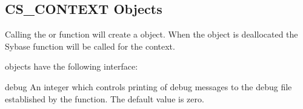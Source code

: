 \subsection{CS_CONTEXT Objects}

Calling the  or 
function will create a  object.  When the
 object is deallocated the Sybase
 function will be called for the context.

 objects have the following interface:

\begin{memberdesc}[CS_CONTEXT]{debug}
An integer which controls printing of debug messages to the debug file
established by the  function.  The default value
is zero.
\end{memberdesc}

